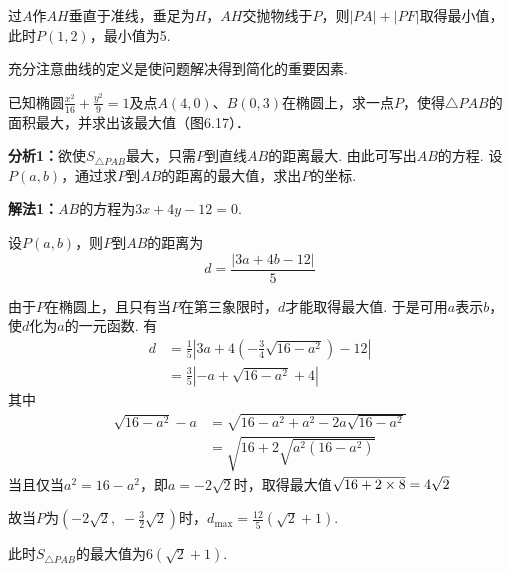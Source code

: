 \begin{solution}
过$A$作$AH$垂直于准线，垂足为$H$，$AH$交抛物线于$P$，则$|PA|+|PF|$取得最小值，此时$P(1,2)$，最小值为5.
\end{solution}

\begin{remark}
    充分注意曲线的定义是使问题解决得到简化的重要因素.
\end{remark}


\noindent
\begin{minipage}{.5\textwidth}
\begin{example}
已知椭圆$\frac{x^2}{16}+\frac{y^2}{9}=1$及点$A(4,0)$、$B(0,3)$在椭圆上，求一点$P$，使得$\triangle PAB$的面积最大，并求出该最大值（图6.17）．
\end{example}

\begin{analyze}
\textbf{分析1：}欲使$S_{\triangle PAB}$最大，只需$P$到直线$AB$的距离最大. 由此可写出$AB$的方程. 设$P(a,b)$，通过求$P$到$AB$的距离的最大值，求出$P$的坐标.
\end{analyze}
\end{minipage}\hfill
\begin{minipage}{.48\textwidth}
    \centering
{}    
\end{minipage}



\begin{solution}
\textbf{解法1：}$AB$的方程为$3x+4y-12=0$.

设$P(a,b)$，则$P$到$AB$的距离为
\[d=\frac{|3a+4b-12|}{5}\]

由于$P$在椭圆上，且只有当$P$在第三象限时，$d$才能取得最大值. 于是可用$a$表示$b$，使$d$化为$a$的一元函数. 有
\[\begin{split}
    d&=\frac{1}{5}\left|3a+4\left(-\frac{3}{4}\sqrt{16-a^2}\right)-12\right|\\
    &=\frac{3}{5}\left|-a+\sqrt{16-a^2}+4\right|
\end{split}\]
其中
\[\begin{split}
    \sqrt{16-a^2}-a&=\sqrt{16-a^2+a^2-2a\sqrt{16-a^2}}\\
    &=\sqrt{16+2\sqrt{a^2(16-a^2)}}
\end{split}\]
当且仅当$a^2=16-a^2$，即$a=-2\sqrt{2}$时，取得最大值$\sqrt{16+2\times8}=4\sqrt{2}$

故当$P$为$\left(-2\sqrt{2},\; -\frac{3}{2}\sqrt{2}\right)$时，$d_{\max}=\frac{12}{5}\left(\sqrt{2}+1\right)$.

此时$S_{\triangle PAB}$的最大值为$6(\sqrt{2}+1)$.
\end{solution}


